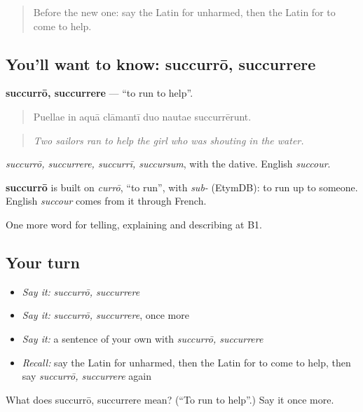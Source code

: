 \begin{quote}
Before the new one: say the Latin for unharmed, then the Latin for to come to help.
\end{quote}

\subsection*{You'll want to know: succurrō, succurrere}
\textbf{succurrō, succurrere} — \textquotedblleft{}to run to help\textquotedblright{}.

\begin{quote}
Puellae in aquā clāmantī duo nautae succurrērunt.
\end{quote}

\begin{quote}
\emph{Two sailors ran to help the girl who was shouting in the water.}
\end{quote}

\emph{succurrō, succurrere, succurrī, succursum}, with the dative. English \emph{succour}.

\begin{cousinweb}
\textbf{succurrō} is built on \emph{currō}, \textquotedblleft{}to run\textquotedblright{}, with \emph{sub-} (EtymDB): to run up to someone. English \emph{succour} comes from it through French.
\end{cousinweb}

\begin{grammarlens}[title={What you've built}]
One more word for telling, explaining and describing at B1.
\end{grammarlens}

\subsection*{Your turn}
\begin{itemize}
\raggedright
  \item \emph{Say it:} \emph{succurrō, succurrere}
  \item \emph{Say it:} \emph{succurrō, succurrere}, once more
  \item \emph{Say it:} a sentence of your own with \emph{succurrō, succurrere}
  \item \emph{Recall:} say the Latin for unharmed, then the Latin for to come to help, then say \emph{succurrō, succurrere} again
\end{itemize}

\begin{tcolorbox}[breakable,colback=teal!4,colframe=teal!35!black,title={Before you move on}]
What does succurrō, succurrere mean? (\textquotedblleft{}To run to help\textquotedblright{}.) Say it once more.
\end{tcolorbox}
